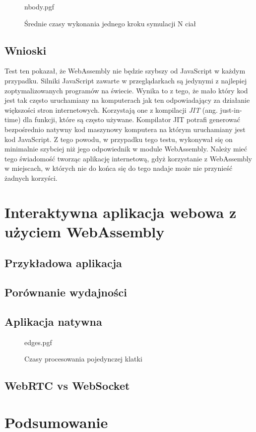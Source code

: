\documentclass[language=polish,type=master]{aghmodern}
\begin{document}
\begin{figure}[H]
    \centering
    {nbody.pgf}
    \caption{Średnie czasy wykonania jednego kroku symulacji N ciał}
    \label{fig:nbody}
\end{figure}

\section{Wnioski}
Test ten pokazał, że WebAssembly nie będzie szybszy od JavaScript w każdym przypadku.
Silniki JavaScript zawarte w przeglądarkach są jedynymi z najlepiej zoptymalizowanych programów na świecie.
Wynika to z tego, że mało który kod jest tak często uruchamiany na komputerach jak ten odpowiadający za działanie większości stron internetowych.
Korzystają one z kompilacji \emph{JIT}\footnotemark{} (ang. just-in-time) dla funkcji, które są często używane.
Kompilator JIT potrafi generować bezpośrednio natywny kod maszynowy komputera na którym uruchamiany jest kod JavaScript.
Z tego powodu, w przypadku tego testu, wykonywał się on minimalnie szybciej niż jego odpowiednik w module WebAssembly.
Należy mieć tego świadomość tworząc aplikację internetową, gdyż korzystanie z WebAssembly w miejscach, w których nie do końca się do tego nadaje może nie przynieść żadnych korzyści.

\chapter{Interaktywna aplikacja webowa z użyciem WebAssembly}

\section{Przykładowa aplikacja}

\section{Porównanie wydajności}

\section{Aplikacja natywna}

\begin{figure}[H]
    \centering
    {edges.pgf}
    \caption{Czasy procesowania pojedynczej klatki}
    \label{fig:edges}
\end{figure}

\section{WebRTC vs WebSocket}

\chapter{Podsumowanie}

\backmatter

\cleardoublepage
\renewcommand\listoflistingscaption{Spis listingów}
\listoflistings

\cleardoublepage
\listoffigures

\cleardoublepage
\printbibliography
\end{document}
